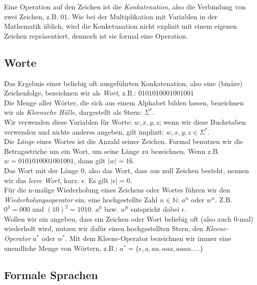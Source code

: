 \noindent
Eine Operation auf den Zeichen ist die \emph{Konkatenation},
also die Verbindung von zwei Zeichen, z.B. $01$.
Wie bei der Multiplikation mit Variablen in der Mathematik üblich,
wird die Konketanation nicht explizit mit einem eigenen Zeichen repräsentiert,
dennoch ist sie formal eine Operation.

\subsection{Worte}
Das Ergebnis einer beliebig oft ausgeführten Konkatenation,
also eine (binäre) Zeichenfolge,
bezeichnen wir als \emph{Wort}, z.B.: $0101010001001001$\\

\noindent
Die Menge aller Wörter,
die sich aus einem Alphabet bilden lassen,
bezeichnen wir als \emph{Kleensche Hülle}, dargestellt als Stern: $\Sigma^*$.\\

\noindent
Wir verwenden diese Variablen für Worte:
$w, x, y, z$; wenn wir diese Buchstaben verwenden und nichts anderes angeben,
gilt implizit: $w, x, y, z \in \Sigma^*$.\\

\noindent
Die \emph{Länge} eines Wortes ist die Anzahl seiner Zeichen.
Formal benutzen wir die Betragsstriche um ein Wort, um seine
Länge zu bezeichnen. Wenn z.B. $w = 0101010001001001$, dann gilt $|w| = 16$.\\

\noindent
Das Wort mit der Länge 0, also das Wort, dass aus null Zeichen besteht,
nennen wir das \emph{leere Wort}, kurz: $\epsilon$.
Es gilt $|\epsilon| = 0$.\\

\noindent
Für die n-malige Wiederholung eines Zeichens oder Wortes führen wir den \emph{Wiederholungsoperator}
ein, eine hochgestellte Zahl $n \in \mathbb{N}$: $a^n$ oder $w^n$.
Z.B. $0^3 = 000$ und $(10)^2 = 1010$.
$a^0$ bzw. $w^0$ entspricht dabei $\epsilon$.\\

\noindent
Wollen wir ein angeben, dass ein Zeichen oder Wort beliebig oft (also auch 0-mal) wiederholt
wird, nutzen wir dafür einen hochgestellten Stern, den \emph{Kleene-Operator} $a^*$ oder $w^*$.
Mit dem Kleene-Operator bezeichnen wir immer eine unendliche Menge von Wörtern, z.B.:
$a^* = \{\epsilon, a, aa, aaa, aaaa, \dots\}$

\subsection{Formale Sprachen}

